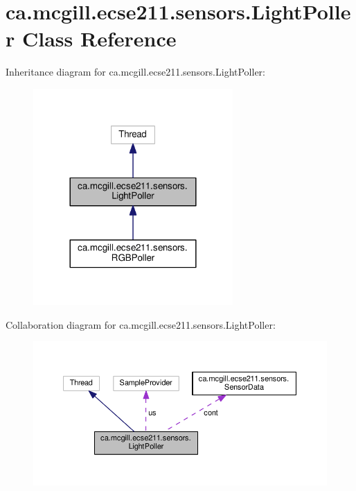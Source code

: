 \hypertarget{classca_1_1mcgill_1_1ecse211_1_1sensors_1_1_light_poller}{}\section{ca.\+mcgill.\+ecse211.\+sensors.\+Light\+Poller Class Reference}
\label{classca_1_1mcgill_1_1ecse211_1_1sensors_1_1_light_poller}


Inheritance diagram for ca.\+mcgill.\+ecse211.\+sensors.\+Light\+Poller\+:\nopagebreak
\begin{figure}[H]
\begin{center}
\leavevmode
\includegraphics[width=216pt]{classca_1_1mcgill_1_1ecse211_1_1sensors_1_1_light_poller__inherit__graph}
\end{center}
\end{figure}


Collaboration diagram for ca.\+mcgill.\+ecse211.\+sensors.\+Light\+Poller\+:\nopagebreak
\begin{figure}[H]
\begin{center}
\leavevmode
\includegraphics[width=350pt]{classca_1_1mcgill_1_1ecse211_1_1sensors_1_1_light_poller__coll__graph}
\end{center}
\end{figure}
